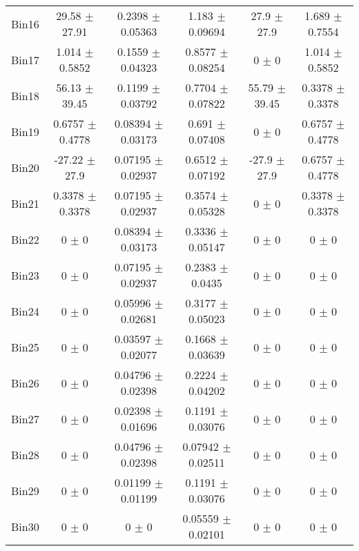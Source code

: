 \begin{tabular}{@{\extracolsep{4pt}}lccccc@{}}
     Bin16 & 29.58 $\pm$ 27.91 & 0.2398 $\pm$ 0.05363 & 1.183 $\pm$ 0.09694 & 27.9 $\pm$ 27.9 & 1.689 $\pm$ 0.7554 \\ 
     Bin17 & 1.014 $\pm$ 0.5852 & 0.1559 $\pm$ 0.04323 & 0.8577 $\pm$ 0.08254 & 0 $\pm$ 0 & 1.014 $\pm$ 0.5852 \\ 
     Bin18 & 56.13 $\pm$ 39.45 & 0.1199 $\pm$ 0.03792 & 0.7704 $\pm$ 0.07822 & 55.79 $\pm$ 39.45 & 0.3378 $\pm$ 0.3378 \\ 
     Bin19 & 0.6757 $\pm$ 0.4778 & 0.08394 $\pm$ 0.03173 & 0.691 $\pm$ 0.07408 & 0 $\pm$ 0 & 0.6757 $\pm$ 0.4778 \\ 
     Bin20 & -27.22 $\pm$ 27.9 & 0.07195 $\pm$ 0.02937 & 0.6512 $\pm$ 0.07192 & -27.9 $\pm$ 27.9 & 0.6757 $\pm$ 0.4778 \\ 
     Bin21 & 0.3378 $\pm$ 0.3378 & 0.07195 $\pm$ 0.02937 & 0.3574 $\pm$ 0.05328 & 0 $\pm$ 0 & 0.3378 $\pm$ 0.3378 \\ 
     Bin22 & 0 $\pm$ 0 & 0.08394 $\pm$ 0.03173 & 0.3336 $\pm$ 0.05147 & 0 $\pm$ 0 & 0 $\pm$ 0 \\ 
     Bin23 & 0 $\pm$ 0 & 0.07195 $\pm$ 0.02937 & 0.2383 $\pm$ 0.0435 & 0 $\pm$ 0 & 0 $\pm$ 0 \\ 
     Bin24 & 0 $\pm$ 0 & 0.05996 $\pm$ 0.02681 & 0.3177 $\pm$ 0.05023 & 0 $\pm$ 0 & 0 $\pm$ 0 \\ 
     Bin25 & 0 $\pm$ 0 & 0.03597 $\pm$ 0.02077 & 0.1668 $\pm$ 0.03639 & 0 $\pm$ 0 & 0 $\pm$ 0 \\ 
     Bin26 & 0 $\pm$ 0 & 0.04796 $\pm$ 0.02398 & 0.2224 $\pm$ 0.04202 & 0 $\pm$ 0 & 0 $\pm$ 0 \\ 
     Bin27 & 0 $\pm$ 0 & 0.02398 $\pm$ 0.01696 & 0.1191 $\pm$ 0.03076 & 0 $\pm$ 0 & 0 $\pm$ 0 \\ 
     Bin28 & 0 $\pm$ 0 & 0.04796 $\pm$ 0.02398 & 0.07942 $\pm$ 0.02511 & 0 $\pm$ 0 & 0 $\pm$ 0 \\ 
     Bin29 & 0 $\pm$ 0 & 0.01199 $\pm$ 0.01199 & 0.1191 $\pm$ 0.03076 & 0 $\pm$ 0 & 0 $\pm$ 0 \\ 
     Bin30 & 0 $\pm$ 0 & 0 $\pm$ 0 & 0.05559 $\pm$ 0.02101 & 0 $\pm$ 0 & 0 $\pm$ 0 \\ 
\hline\hline
  \end{tabular}
